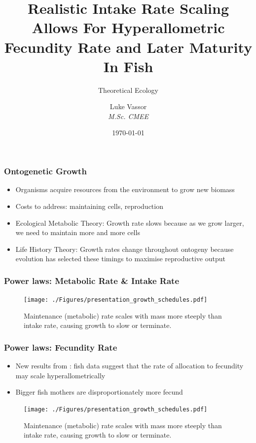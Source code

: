 \documentclass[handout]{beamer}
\institute{\texttt{[image: logo.png]}}
\title{Realistic Intake Rate Scaling Allows For Hyperallometric Fecundity Rate and Later Maturity In Fish}
\subtitle{Theoretical Ecology}
\author{Luke Vassor \\ \textit{M.Sc. CMEE}}
\date{\today}
\begin{document}
 
\frame{\titlepage}


\begin{frame}
	\frametitle{Ontogenetic Growth}
	\begin{itemize}
		\item Organisms acquire resources from the environment to grow new biomass
		\item Costs to address: maintaining cells, reproduction
		\item Ecological Metabolic Theory: Growth rate slows because as we grow larger, we need to maintain more and more cells
		\item Life History Theory: Growth rates change throughout ontogeny because evolution has selected these timings to maximise reproductive output
	\end{itemize}

			
\end{frame}


\begin{frame}
	\frametitle{Power laws: Metabolic Rate \& Intake Rate}
		\centering
		\begin{figure}
			\texttt{[image: ./Figures/presentation\_growth\_schedules.pdf]} \
			\caption{Maintenance (metabolic) rate scales with mass more steeply than intake rate, causing growth to slow or terminate.}
		\end{figure}
\end{frame}

\begin{frame}
	\frametitle{Power laws: Fecundity Rate}
	\begin{itemize}
		\item New results from \textcite{Barneche2018-reproductive_output}: fish data suggest that the rate of allocation to fecundity may scale hyperallometrically
		\item Bigger fish mothers are disproportionately more fecund
	\end{itemize}
		\centering
		\begin{figure}
			\texttt{[image: ./Figures/presentation\_growth\_schedules.pdf]} \
			\caption{Maintenance (metabolic) rate scales with mass more steeply than intake rate, causing growth to slow or terminate.}
		\end{figure}
\end{frame}
\end{document}
